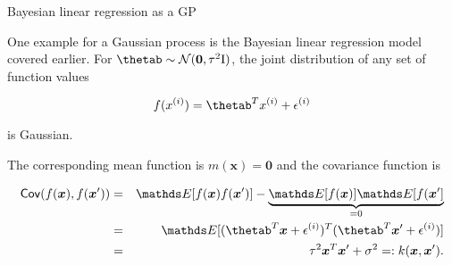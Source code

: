 \begin{vbframe}{Bayesian linear regression as a GP}

One example for a Gaussian process is the Bayesian linear regression model covered earlier. For  $\thetab \sim \mathcal{N}(\bm{0}, \tau^2 \id)$, the joint distribution of any set of function values 

$$
f(\xi) = \thetab^T \xi + \epsi
$$

is Gaussian. 

\vspace*{0.3cm}

The corresponding mean function is $m(\bm{x}) = \bm{0}$ and the covariance function is

\vspace*{-0.5cm}

\begin{eqnarray*}
\cov(f(\bm{x}), f(\bm{x}^\prime)) &=& \E[f(\bm{x}) f(\bm{x}^\prime)] - \underbrace{\E[f(\bm{x})] \E[f(\bm{x}^\prime]}_{= 0} \\ &=& \E[(\thetab^T \bm{x} + \epsi)^T(\thetab^T \bm{x}^\prime + \epsi)] \\ &=&  \tau^2 \bm{x}^T\bm{x}^\prime + \sigma^2 =: k(\bm{x}, \bm{x}^\prime).
\end{eqnarray*}

% 
% 
% 
% 
% 

\end{vbframe}

